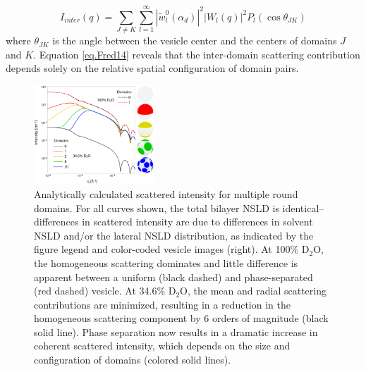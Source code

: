 \documentclass[8.5pt,twoside,twocolumn]{article}
\begin{document}
\begin{equation}
\label{eq.Fred14}
	I_{inter}(q) = \sum_{J\neq K} \sum_{l=1}^{\infty}|\tilde{w}_l^0(\alpha_d)|^2|W_l(q)|^2P_l(\cos\theta_{JK})
\end{equation}
where $\theta_{JK}$ is the angle between the vesicle center and the centers of domains $J$ and $K$. Equation \ref{eq.Fred14} reveals that the inter-domain scattering contribution depends solely on the relative spatial configuration of domain pairs.


\begin{figure} [t]
	\centering
	\includegraphics[width=0.4\textwidth]{figures/figure_4_analytical_model.eps}
	\caption{Analytically calculated scattered intensity for multiple round domains. For all curves shown, the total bilayer NSLD is identical--differences in scattered intensity are due to differences in solvent NSLD and/or the lateral NSLD distribution, as indicated by the figure legend and color-coded vesicle images (right). At 100\% D$_2$O, the homogeneous scattering dominates and little difference is apparent between a uniform (black dashed) and phase-separated (red dashed) vesicle. At 34.6\% D$_2$O, the mean and radial scattering contributions are minimized, resulting in a reduction in the homogeneous scattering component by 6 orders of magnitude (black solid line). Phase separation now results in a dramatic increase in coherent scattered intensity, which depends on the size and configuration of domains (colored solid lines).}
	\label{fig:analytical}
	
\end{figure}
\end{document}
